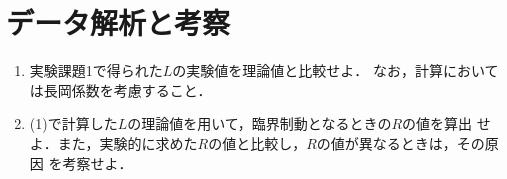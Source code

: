 
\section{データ解析と考察}
\begin{enumerate}
    \item 実験課題1で得られた$L$の実験値を理論値と比較せよ．
    なお，計算においては長岡係数を考慮すること．
    \begin{description}
        \item[] 
    \end{description}

    \item (1)で計算した$L$の理論値を用いて，臨界制動となるときの$R$の値を算出
    せよ．また，実験的に求めた$R$の値と比較し，$R$の値が異なるときは，その原因
    を考察せよ．
    \begin{description}
        \item[] 
    \end{description}
\end{enumerate}